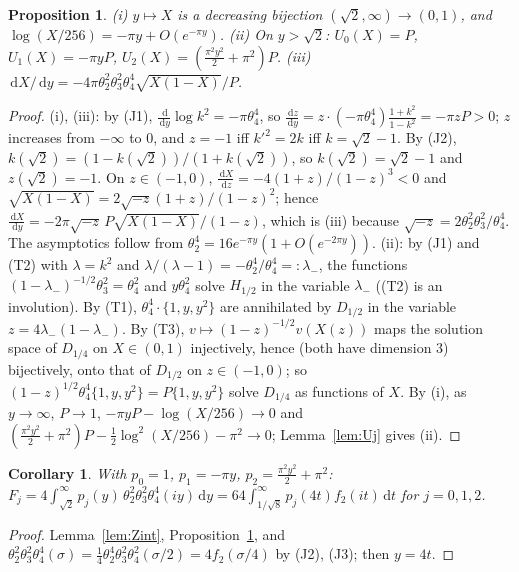 \documentclass[11pt]{amsart}
\newtheorem{proposition}[theorem]{Proposition}
\newtheorem{corollary}[theorem]{Corollary}
\theoremstyle{definition}
\theoremstyle{remark}
\numberwithin{equation}{section}
\newcommand{\dd}{\,\mathrm{d}}
\begin{document}
\begin{proposition}\label{prop:paramA}
\textup{(i)} $y\mapsto X$ is a decreasing bijection $(\sqrt2,\infty)\to(0,1)$, and $\log(X/256)=-\pi y+O(e^{-\pi y})$.
\textup{(ii)} On $y>\sqrt2$: $U_0(X)=P$, $U_1(X)=-\pi yP$, $U_2(X)=(\frac{\pi^2y^2}2+\pi^2)P$.
\textup{(iii)} $\dd X/\dd y=-4\pi\theta_2^2\theta_3^2\theta_4^4\sqrt{X(1-X)}/P$.
\end{proposition}
\begin{proof}
(i), (iii): by (J1), $\frac{\dd}{\dd y}\log k^2=-\pi\theta_4^4$, so $\frac{\dd z}{\dd y}=z\cdot(-\pi\theta_4^4)\frac{1+k^2}{1-k^2}=-\pi zP>0$; $z$ increases from $-\infty$ to $0$, and $z=-1$ iff $k'^2=2k$ iff $k=\sqrt2-1$. By (J2), $k(\sqrt2)=(1-k(\sqrt2))/(1+k(\sqrt2))$, so $k(\sqrt2)=\sqrt2-1$ and $z(\sqrt2)=-1$. On $z\in(-1,0)$, $\frac{\dd X}{\dd z}=-4(1+z)/(1-z)^3<0$ and $\sqrt{X(1-X)}=2\sqrt{-z}(1+z)/(1-z)^2$; hence $\frac{\dd X}{\dd y}=-2\pi\sqrt{-z}\,P\sqrt{X(1-X)}/(1-z)$, which is (iii) because $\sqrt{-z}=2\theta_2^2\theta_3^2/\theta_4^4$. The asymptotics follow from $\theta_2^4=16e^{-\pi y}(1+O(e^{-2\pi y}))$.
(ii): by (J1) and (T2) with $\lambda=k^2$ and $\lambda/(\lambda-1)=-\theta_2^4/\theta_4^4=:\lambda_-$, the functions $(1-\lambda_-)^{-1/2}\theta_3^2=\theta_4^2$ and $y\theta_4^2$ solve $H_{1/2}$ in the variable $\lambda_-$ ((T2) is an involution). By (T1), $\theta_4^4\cdot\{1,y,y^2\}$ are annihilated by $D_{1/2}$ in the variable $z=4\lambda_-(1-\lambda_-)$. By (T3), $v\mapsto(1-z)^{-1/2}v(X(z))$ maps the solution space of $D_{1/4}$ on $X\in(0,1)$ injectively, hence (both have dimension 3) bijectively, onto that of $D_{1/2}$ on $z\in(-1,0)$; so $(1-z)^{1/2}\theta_4^4\{1,y,y^2\}=P\{1,y,y^2\}$ solve $D_{1/4}$ as functions of $X$. By (i), as $y\to\infty$, $P\to1$, $-\pi yP-\log(X/256)\to0$ and $(\frac{\pi^2y^2}2+\pi^2)P-\frac12\log^2(X/256)-\pi^2\to0$; Lemma~\ref{lem:Uj} gives (ii).
\end{proof}

\begin{corollary}\label{cor:A}
With $p_0=1$, $p_1=-\pi y$, $p_2=\frac{\pi^2y^2}2+\pi^2$: $F_j=4\int_{\sqrt2}^\infty p_j(y)\,\theta_2^2\theta_3^2\theta_4^4(iy)\dd y=64\int_{1/\sqrt8}^\infty p_j(4t)f_2(it)\dd t$ for $j=0,1,2$.
\end{corollary}
\begin{proof}
Lemma~\ref{lem:Zint}, Proposition~\ref{prop:paramA}, and $\theta_2^2\theta_3^2\theta_4^4(\sigma)=\frac14\theta_2^4\theta_3^2\theta_4^2(\sigma/2)=4f_2(\sigma/4)$ by (J2), (J3); then $y=4t$.
\end{proof}
\end{document}
